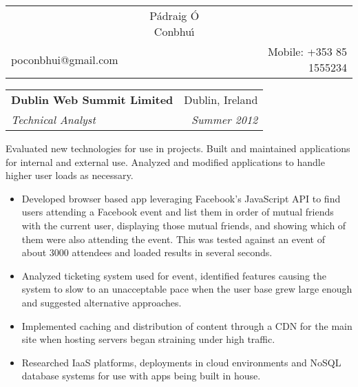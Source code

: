 \documentclass[11pt]{article}
\makeatletter
\newcommand{\resumeSection}[1]{
    \par
    \vspace{\baselineskip}
    \large {\sc {#1}}
    \par
    \vspace{-0.9\baselineskip}
    \hrulefill
    \vspace{0.5\baselineskip}
    \par
}
\newenvironment{resumeSubSectionHeader}{
    \par
    \begin{tabular*}{\textwidth}{l@{\extracolsep{\fill}}r}
    \par
} {
    \end{tabular*}
    \par
}
\newenvironment{resumeSubSectionBody}{
    \par
    \vspace{-0.8\parskip}
    \begin{small}
    \par
} {
    \par
    \end{small}
    \par
}
\makeatother
\begin{document}
\begin{center}
\begin{tabular*}{\textwidth}{@{\extracolsep{\fill}}lcr}

    &{ \huge \textbf \sc P\'{a}draig \'{O} Conbhu\'{\i} }&\\ %
    poconbhui@gmail.com &  & Mobile: +353 85 1555234\\
    \hline\hline

\end{tabular*}
\end{center}


\resumeSection{Experience}


%
%
\begin{resumeSubSectionHeader}

    \textbf{Dublin Web Summit Limited} & Dublin, Ireland \\
    \emph{Technical Analyst}           & \emph{Summer 2012}

\end{resumeSubSectionHeader}
\begin{resumeSubSectionBody}

    Evaluated new technologies for use in projects.
    Built and maintained applications for internal and external use.
    Analyzed and modified applications to handle  higher user loads
    as necessary.

    \begin{itemize}
        \item
            Developed browser based app leveraging Facebook's
            JavaScript API to find users attending a Facebook event
            and list them in order of mutual friends with the current user,
            displaying those mutual friends, and showing which of them
            were also attending the event.
            This was tested against an event of about 3000 attendees and
            loaded results in several seconds.

        \item
            Analyzed ticketing system used for event, identified features
            causing the system to slow to an unacceptable pace when the
            user base grew large enough and suggested alternative
            approaches.

        \item
            Implemented caching and distribution of content through a CDN
            for the main site when hosting servers began straining under
            high traffic.

        \item
            Researched IaaS platforms, deployments in cloud environments
            and NoSQL database systems for use with apps being built in
            house.
    \end{itemize}

\end{resumeSubSectionBody}
\end{document}
